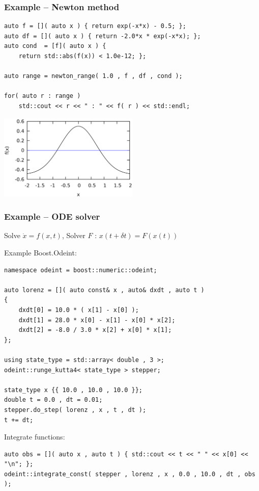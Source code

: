 \documentclass{beamer}
\newcommand{\heading}[1]{\frametitle{#1}}
\newcommand{\odeint}[0]{Boost.Odeint}
\begin{document}
\begin{frame}[fragile]
 \heading{Example -- Newton method}
 
\begin{lstlisting}[basicstyle=\scriptsize\ttfamily]
auto f = []( auto x ) { return exp(-x*x) - 0.5; };
auto df = []( auto x ) { return -2.0*x * exp(-x*x); };
auto cond  = [f]( auto x ) {
    return std::abs(f(x)) < 1.0e-12; };

auto range = newton_range( 1.0 , f , df , cond );

for( auto r : range )
    std::cout << r << " : " << f( r ) << std::endl;
\end{lstlisting}

 \centerline{ 
\includegraphics[draft=false,width=0.5\textwidth]{newton1}} 

\end{frame}





\begin{frame}[fragile]
  \heading{Example -- ODE solver}
  
  Solve $\dot{x} = f(x,t)$, Solver $F$ : $x(t+\delta t)=F(x(t))$
  
  Example \odeint:
  
\begin{lstlisting}[basicstyle=\tiny\ttfamily]
namespace odeint = boost::numeric::odeint;

auto lorenz = []( auto const& x , auto& dxdt , auto t )
{
    dxdt[0] = 10.0 * ( x[1] - x[0] );
    dxdt[1] = 28.0 * x[0] - x[1] - x[0] * x[2];
    dxdt[2] = -8.0 / 3.0 * x[2] + x[0] * x[1];
};

using state_type = std::array< double , 3 >;
odeint::runge_kutta4< state_type > stepper;

state_type x {{ 10.0 , 10.0 , 10.0 }};
double t = 0.0 , dt = 0.01;
stepper.do_step( lorenz , x , t , dt );
t += dt;
  \end{lstlisting}
  
Integrate functions:
\begin{lstlisting}[basicstyle=\tiny\ttfamily]
auto obs = []( auto x , auto t ) { std::cout << t << " " << x[0] << "\n"; };
odeint::integrate_const( stepper , lorenz , x , 0.0 , 10.0 , dt , obs );
\end{lstlisting}

\end{frame}
\end{document}

